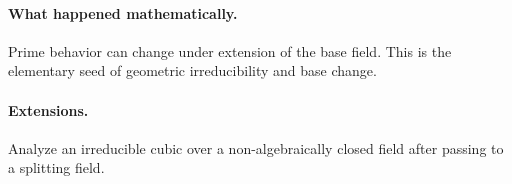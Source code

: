 \paragraph{What happened mathematically.}
Prime behavior can change under extension of the base field.  This is the elementary seed
of geometric irreducibility and base change.

\paragraph{Extensions.}
Analyze an irreducible cubic over a non-algebraically closed field after passing to a
splitting field.
\fi
